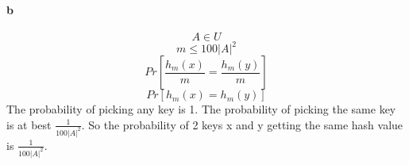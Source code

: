 \paragraph{b}
\begin{equation}
    A \in U
\end{equation}
\begin{equation}
    m \le 100|A|^{2}
\end{equation}
\begin{equation}
    Pr \left[ \frac{h_m(x)}{m} = \frac{h_m(y)}{m}\right]
\end{equation}
\begin{equation}
    Pr \left[ h_m(x) = h_m(y) \right]
\end{equation}
The probability of picking any key is 1. The probability of picking the same key is at best $\frac{1}{100|A|^{2}}$.
So the probability of 2 keys x and y getting the same hash value is $\frac{1}{100|A|^{2}}$.



